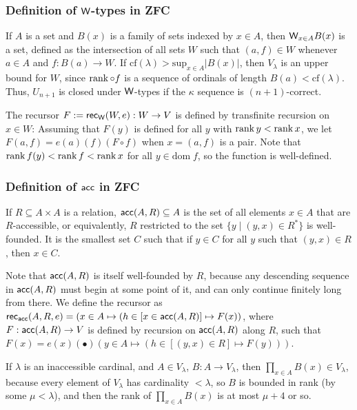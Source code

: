 \subsubsection{Definition of $\mathsf{W}$-types in ZFC}
If $A$ is a set and $B(x)$ is a family of sets indexed by $x\in A$, then $\mathsf{W}_{x\in A}B(x)$ is a set, defined as the intersection of all sets $W$ such that $(a,f)\in W$ whenever $a\in A$ and $f:B(a)\to W$. If $\mathrm{cf}(\lambda)>\mathrm{sup}_{x\in A}|B(x)|$, then $V_\lambda$ is an upper bound for $W$, since $\operatorname{rank}\circ f$ is a sequence of ordinals of length $B(a)<\mathrm{cf}(\lambda)$. Thus, $U_{n+1}$ is closed under $\mathsf{W}$-types if the $\kappa$ sequence is $(n+1)$-correct.

The recursor $F:=\mathsf{rec}_{\mathsf{W}}(W,e):W\to V$ is defined by transfinite recursion on $x\in W$: Assuming that $F(y)$ is defined for all $y$ with $\operatorname{rank} y<\operatorname{rank} x$, we let $F(a,f)=e(a)(f)(F\circ f)$ when $x=(a,f)$ is a pair. Note that $\operatorname{rank} f(y)<\operatorname{rank} f<\operatorname{rank} x$ for all $y\in\mathrm{dom}\;f$, so the function is well-defined.

\subsubsection{Definition of $\mathsf{acc}$ in ZFC}
If $R\subseteq A\times A$ is a relation, $\mathsf{acc}(A,R)\subseteq A$ is the set of all elements $x\in A$ that are $R$-accessible, or equivalently, $R$ restricted to the set $\{y\mid (y,x)\in R^*\}$ is well-founded. It is the smallest set $C$ such that if $y\in C$ for all $y$ such that $(y,x)\in R$, then $x\in C$.

Note that $\mathsf{acc}(A,R)$ is itself well-founded by $R$, because any descending sequence in $\mathsf{acc}(A,R)$ must begin at some point of it, and can only continue finitely long from there. We define the recursor as $\mathsf{rec}_{\mathsf{acc}}(A,R,e)=(x\in A\mapsto (h\in [x\in\mathsf{acc}(A,R)]\mapsto F(x))$, where $F:\mathsf{acc}(A,R)\to V$ is defined by recursion on $\mathsf{acc}(A,R)$ along $R$, such that $F(x)=e(x)(\bullet)(y\in A\mapsto (h\in[(y,x)\in R]\mapsto F(y)))$.

\begin{remark}\label{rem:inacc_dprod}
If $\lambda$ is an inaccessible cardinal, and $A\in V_\lambda$, $B:A\to V_\lambda$, then $\prod_{x\in A} B(x)\in V_\lambda$, because every element of $V_\lambda$ has cardinality $<\lambda$, so $B$ is bounded in rank (by some $\mu<\lambda$), and then the rank of $\prod_{x\in A} B(x)$ is at most $\mu+4$ or so.
\end{remark}

